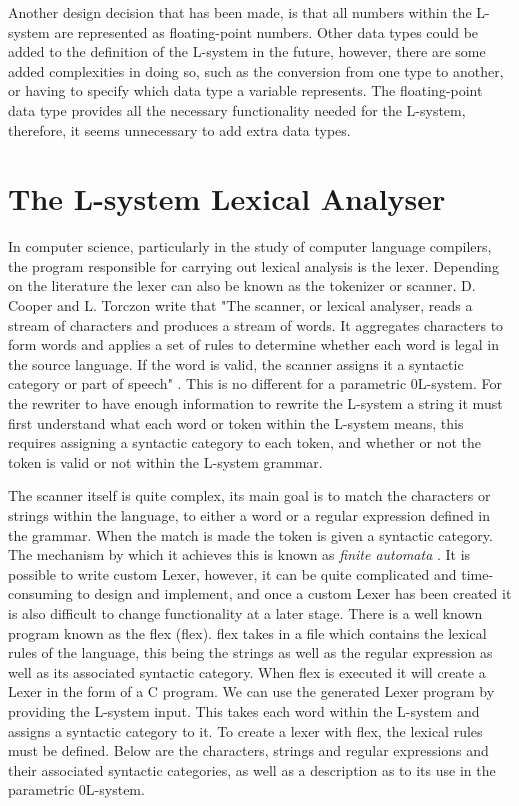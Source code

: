 Another design decision that has been made, is that all numbers within the L-system are represented as floating-point numbers. Other data types could be added to the definition of the L-system in the future, however, there are some added complexities in doing so, such as the conversion from one type to another, or having to specify which data type a variable represents. The floating-point data type provides all the necessary functionality needed for the L-system, therefore, it seems unnecessary to add extra data types. 

\section{The L-system Lexical Analyser} \label{Flex}

In computer science, particularly in the study of computer language compilers, the program responsible for carrying out lexical analysis is the lexer. Depending on the literature the lexer can also be known as the tokenizer or scanner. D. Cooper and L. Torczon write that "The scanner, or lexical analyser, reads a stream of characters and produces a stream of words. It aggregates characters to form words and applies a set of rules to determine whether each word is legal in the source language. If the word is valid, the scanner assigns it a syntactic category or part of speech" \cite{cooper2011engineering}. This is no different for a parametric 0L-system. For the rewriter to have enough information to rewrite the L-system a string it must first understand what each word or token within the L-system means, this requires assigning a syntactic category to each token, and whether or not the token is valid or not within the L-system grammar.  

The scanner itself is quite complex, its main goal is to match the characters or strings within the language, to either a word or a regular expression defined in the grammar. When the match is made the token is given a syntactic category. The mechanism by which it achieves this is known as \textit{finite automata} \cite{wilhelm2013compiler}. It is possible to write custom \gls{Lexer}, however, it can be quite complicated and time-consuming to design and implement, and once a custom \gls{Lexer} has been created it is also difficult to change functionality at a later stage. There is a well known program known as the \acrlong{flex} (\acrshort{flex}). \acrshort{flex} takes in a file which contains the lexical rules of the language, this being the strings as well as the regular expression as well as its associated syntactic category. When \acrshort{flex} is executed it will create a \gls{Lexer} in the form of a C program. We can use the generated Lexer program by providing the L-system input. This takes each word within the L-system and assigns a syntactic category to it. To create a lexer with \acrshort{flex}, the lexical rules must be defined. Below are the characters, strings and regular expressions and their associated syntactic categories, as well as a description as to its use in the parametric 0L-system. 

